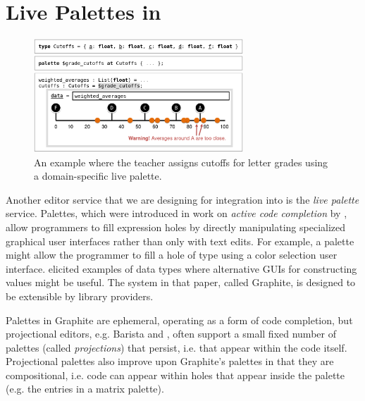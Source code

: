 
\section{Live Palettes in \Hazel}
\label{sec:palettes}


\begin{figure}[t]
\vspace{-4px}
\includegraphics[width=0.7\textwidth]{images/cutoffs-new-elided.png}
\caption{An example where the teacher assigns cutoffs 
for letter grades using a domain-specific live palette.}
\label{fig:cutoffs-example}
\vspace{-7px}
\end{figure}

Another editor service that we are designing for integration into \Hazel 
is the \emph{live palette} service.
Palettes, which were introduced in work on
\emph{active code completion} by \citet{ActiveCodeCompletion},  allow programmers to fill expression
holes by directly manipulating specialized graphical user interfaces rather than only with text edits. For example, a palette might allow the programmer to 
fill a hole of type  using a color selection  
user interface.
\citet{ActiveCodeCompletion} elicited examples of data types where alternative GUIs
for constructing values might be useful.
The system in that paper, called {Graphite}, is designed to be extensible by library providers. 

Palettes in {Graphite} 
are ephemeral, operating as a form of code completion, but projectional editors, e.g. Barista \cite{ko_barista:_2006} and  \cite{voelter_mbeddr:_2012}, often support a small fixed number of  
palettes (called \emph{projections}) that persist, i.e. that appear within the code itself. 
Projectional palettes also improve upon Graphite's palettes in that they are compositional, i.e. code can appear within holes that appear inside the palette (e.g. the entries in a matrix palette). 

